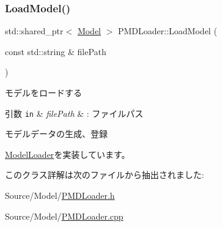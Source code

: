\mbox{\label{class_p_m_d_loader_ae1da98c6236a58940ec521521e5c8288}} 
\subsubsection{\texorpdfstring{Load\+Model()}{LoadModel()}}
{\footnotesize\ttfamily std\+::shared\+\_\+ptr$<$ \mbox{\hyperlink{class_model}{Model}} $>$ P\+M\+D\+Loader\+::\+Load\+Model (\begin{DoxyParamCaption}\item[{const std\+::string \&}]{file\+Path }\end{DoxyParamCaption})\hspace{0.3cm}{\ttfamily [virtual]}}

モデルをロードする 
\begin{DoxyParams}[1]{引数}
\mbox{\tt in}  & {\em file\+Path} & \+: ファイルパス \\
\hline
\end{DoxyParams}
モデルデータの生成、登録 

\mbox{\hyperlink{class_model_loader_a8e2157daa8d364c36fd26922f04adcb0}{Model\+Loader}}を実装しています。



このクラス詳解は次のファイルから抽出されました\+:\begin{DoxyCompactItemize}
\item 
Source/\+Model/\mbox{\hyperlink{_p_m_d_loader_8h}{P\+M\+D\+Loader.\+h}}\item 
Source/\+Model/\mbox{\hyperlink{_p_m_d_loader_8cpp}{P\+M\+D\+Loader.\+cpp}}\end{DoxyCompactItemize}
